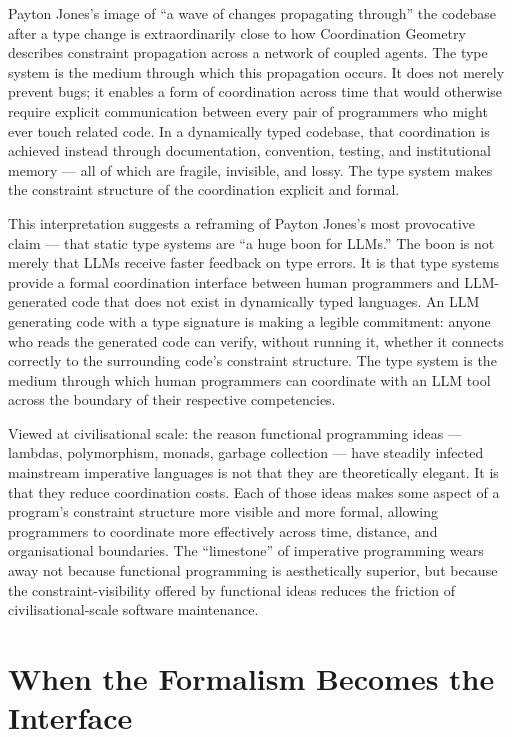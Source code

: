 \documentclass[12pt]{article}
\begin{document}
Payton Jones's image of ``a wave of changes propagating through'' the codebase
after a type change is extraordinarily close to how Coordination Geometry
describes constraint propagation across a network of coupled agents. The type
system is the medium through which this propagation occurs. It does not merely
prevent bugs; it enables a form of coordination across time that would otherwise
require explicit communication between every pair of programmers who might ever
touch related code. In a dynamically typed codebase, that coordination is
achieved instead through documentation, convention, testing, and institutional
memory — all of which are fragile, invisible, and lossy. The type system makes
the constraint structure of the coordination explicit and formal.

This interpretation suggests a reframing of Payton Jones's most provocative
claim — that static type systems are ``a huge boon for LLMs.'' The boon is not
merely that LLMs receive faster feedback on type errors. It is that type systems
provide a formal coordination interface between human programmers and LLM-
generated code that does not exist in dynamically typed languages. An LLM
generating code with a type signature is making a legible commitment: anyone
who reads the generated code can verify, without running it, whether it connects
correctly to the surrounding code's constraint structure. The type system is the
medium through which human programmers can coordinate with an LLM tool across
the boundary of their respective competencies.

Viewed at civilisational scale: the reason functional programming ideas —
lambdas, polymorphism, monads, garbage collection — have steadily infected
mainstream imperative languages is not that they are theoretically elegant. It
is that they reduce coordination costs. Each of those ideas makes some aspect
of a program's constraint structure more visible and more formal, allowing
programmers to coordinate more effectively across time, distance, and
organisational boundaries. The ``limestone'' of imperative programming wears away
not because functional programming is aesthetically superior, but because the
constraint-visibility offered by functional ideas reduces the friction of
civilisational-scale software maintenance.

\section{When the Formalism Becomes the Interface}
\end{document}
